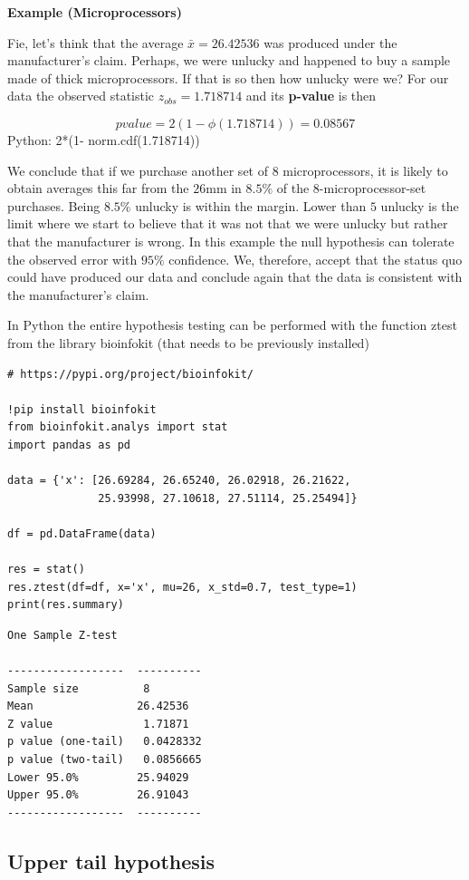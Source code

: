 \documentclass[
]{book}
\begin{document}
\textbf{Example (Microprocessors)}

Fie, let's think that the average \(\bar{x}=26.42536\) was produced under the manufacturer's claim. Perhaps, we were unlucky and happened to buy a sample made of thick microprocessors. If that is so then how unlucky were we? For our data the observed statistic \(z_{obs}=1.718714\) and its \textbf{p-value} is then

\[pvalue=2 (1-\phi(1.718714))=0.08567\]
Python: 2*(1- norm.cdf(1.718714))

We conclude that if we purchase another set of \(8\) microprocessors, it is likely to obtain averages this far from the \(26\)mm in \(8.5\%\) of the \(8\)-microprocessor-set purchases. Being \(8.5\%\) unlucky is within the margin. Lower than \(5%
\) unlucky is the limit where we start to believe that it was not that we were unlucky but rather that the manufacturer is wrong. In this example the null hypothesis can tolerate the observed error with \(95\%\) confidence. We, therefore, accept that the status quo could have produced our data and conclude again that the data is consistent with the manufacturer's claim.

In Python the entire hypothesis testing can be performed with the function ztest from the library bioinfokit (that needs to be previously installed)

\begin{verbatim}
# https://pypi.org/project/bioinfokit/

!pip install bioinfokit
from bioinfokit.analys import stat
import pandas as pd

data = {'x': [26.69284, 26.65240, 26.02918, 26.21622, 
              25.93998, 27.10618, 27.51114, 25.25494]}

df = pd.DataFrame(data)

res = stat()
res.ztest(df=df, x='x', mu=26, x_std=0.7, test_type=1)
print(res.summary)
\end{verbatim}

\begin{verbatim}
One Sample Z-test 

------------------  ----------
Sample size          8
Mean                26.42536
Z value              1.71871
p value (one-tail)   0.0428332
p value (two-tail)   0.0856665
Lower 95.0%         25.94029
Upper 95.0%         26.91043
------------------  ----------
\end{verbatim}

\hypertarget{upper-tail-hypothesis}{%
\subsection{Upper tail hypothesis}\label{upper-tail-hypothesis}}
\end{document}
